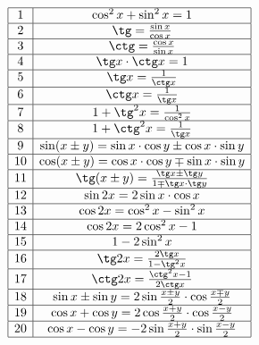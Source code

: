 \documentclass{article}
\begin{document}
\begin{displaymath}
\begin{array}{|c|c|}

  \hline
  1 &\cos^2 x + \sin^2 x = 1\\
  \hline
  2 &\tg = \frac{\sin x}{\cos x}\\
  \hline
  3 &\ctg = \frac{\cos x}{\sin x}\\
  \hline
  4 &\tg x \cdot \ctg x = 1\\
  \hline
  5 &\tg x = \frac{1}{\ctg x}\\
  \hline
  6 &\ctg x = \frac{1}{\tg x}\\
  \hline
  7 &1 + \tg^2 x = \frac{1}{\cos^2 x}\\
  \hline
  8 &1 + \ctg^2 x = \frac{1}{\tg x}\\
  \hline
  9 &\sin (x\pm y) = \sin x \cdot \cos y \pm \cos x \cdot \sin y\\
  \hline
  10&\cos (x\pm y) = \cos x \cdot \cos y \mp \sin x \cdot \sin y\\
  \hline
  11&\tg (x\pm y) = \frac{\tg x \pm \tg y}{1 \mp \tg x \cdot \tg y}\\
  \hline
  12&\sin 2x = 2\sin x \cdot \cos x\\
  \hline
  13&\cos 2x = \cos^2 x - \sin^2 x\\
  \hline
  14&\cos 2x = 2\cos^2 x - 1\\
  \hline
  15&1 - 2\sin^2 x\\
  \hline
  16&\tg 2x = \frac{2\tg x}{1 - \tg^2 x}\\
  \hline
  17&\ctg 2x = \frac{\ctg^2 x - 1}{2\ctg x}\\
  \hline
  18&\sin x \pm \sin y = 2\sin \frac{x\pm y}{2} \cdot \cos \frac{x\mp y}{2}\\
  \hline
  19&\cos x + \cos y = 2\cos\frac{x + y}{2} \cdot \cos\frac{x - y}{2}\\
  \hline
  20&\cos x - \cos y = -2\sin\frac{x + y}{2} \cdot \sin\frac{x - y}{2}\\
  \hline

\end{array}
\end{displaymath}
\end{document}
